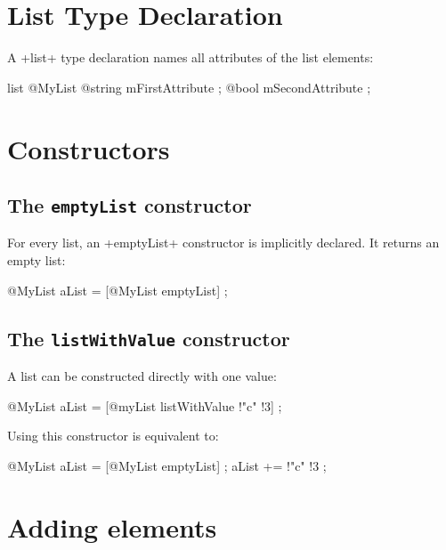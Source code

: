 

\section{List Type Declaration}

A \ggs+list+ type declaration names all attributes of the list elements:

\begin{galgas}
list @MyList {
  @string mFirstAttribute ;
  @bool mSecondAttribute ;
}
\end{galgas}

\section{Constructors}

\subsection{The \texttt{emptyList} constructor}

For every list, an \ggs+emptyList+ constructor is implicitly declared. It returns an empty list:

\begin{galgas}
@MyList aList = [@MyList emptyList] ;
\end{galgas}


\subsection{The \texttt{listWithValue} constructor}

A list can be constructed directly with one value:

\begin{galgas}
@MyList aList = [@myList listWithValue !"c" !3] ;
\end{galgas}


Using this constructor is equivalent to:

\begin{galgas}
@MyList aList = [@MyList emptyList] ;
aList += !"c" !3 ;
\end{galgas}

\section{Adding elements}

